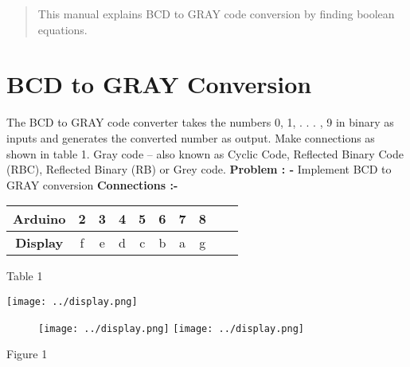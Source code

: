 \documentclass{article}
\begin{document}
\begin{multicols}{2}
\begin{center}
\author{Valmeekam Navya}
\begin{tableofcontents}
\begin{abstract}
    This manual explains BCD to GRAY code conversion by finding boolean equations.
\end{abstract}
\section{BCD to GRAY Conversion}
The BCD to GRAY code converter takes the numbers 0, 1, . . . , 9 in binary as inputs and generates the converted number as output. Make connections as shown in table 1.
Gray code – also known as Cyclic Code, Reflected Binary Code (RBC), Reflected Binary (RB) or Grey code.
\newline
\newline
\textbf{Problem : -}
Implement BCD to GRAY conversion 
\newline
\vspace{4cm}
\newline
\newline
\newline
\newline
\newline
\textbf{Connections :-}
\newline
\newline
\begin{tabular}{|c|c|c|c|c|c|c|c|c|c|}
\hline
\textbf{Arduino} & 2 & 3 & 4 & 5 & 6 & 7 & 8  \\
\hline
\textbf{Display} & {f} & {e} & {d} & {c} & {b} & {a} & {g} \\
\hline
\end{tabular}
\newline
Table 1

\texttt{[image: ../display.png]} 
\begin{figure}[hbtp]
\texttt{[image: ../display.png]}
\texttt{[image: ../display.png]}
\end{figure}
\begin{center}
Figure 1
\end{center}
\newpage

\end{tableofcontents}
\end{center}
\end{multicols}
\end{document}
